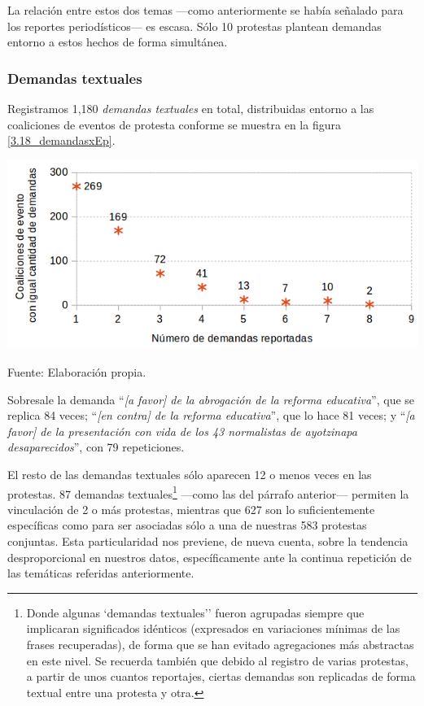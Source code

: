 \documentclass[letterpaper, 11pt]{book}
\theoremstyle{definition}
\theoremstyle{remark}
\begin{document}
La relación entre estos dos temas ---como anteriormente se había señalado para los reportes periodísticos--- es escasa. 
Sólo 10 protestas plantean demandas entorno a estos hechos de forma simultánea.




\subsubsection{Demandas textuales}
\label{subsubsec:demandas_textuales}

Registramos 1,180 \emph{demandas textuales} en total, distribuidas entorno a las coaliciones de eventos de protesta conforme se muestra en la figura \ref{3.18_demandasxEp}. 

\begin{minipage}{\linewidth}
\centering
{} \label{3.18_demandasxEp}
\hspace{-1em}\includegraphics[scale=0.5]{img/3.18_demandasxEp.png}
\par\bigskip
\small Fuente: Elaboración propia.
\end{minipage}\bigskip



Sobresale la demanda ``\emph{[a favor] de la abrogación de la reforma educativa}'', que se replica 84 veces; 
``\emph{[en contra] de la reforma educativa}'', que lo hace 81 veces; 
y ``\emph{[a favor] de la presentación con vida de los 43 normalistas de ayotzinapa desaparecidos}'', con 79 repeticiones. 


El resto de las demandas textuales sólo aparecen 12 o menos veces en las protestas. 
87 demandas textuales\footnote{
    Donde algunas `demandas textuales'' fueron agrupadas siempre que implicaran significados idénticos (expresados en variaciones mínimas de las frases recuperadas), de forma que se han evitado agregaciones más abstractas en este nivel. 
    Se recuerda también que debido al registro de varias protestas, a partir de unos cuantos reportajes, ciertas demandas son replicadas de forma textual entre una protesta y otra. 
} ---como las del párrafo anterior--- permiten la vinculación de 2 o más protestas, mientras que 627 son lo suficientemente específicas como para ser asociadas sólo a una de nuestras 583 protestas conjuntas. 
Esta particularidad nos previene, de nueva cuenta, sobre la tendencia desproporcional en nuestros datos, específicamente ante la continua repetición de las temáticas referidas anteriormente. 
\end{document}
